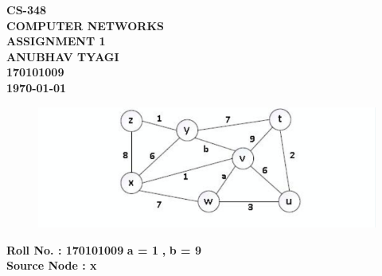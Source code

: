 \documentclass[12pt]{report}
\begin{document}
	\newlength{\strutheight}
	\settoheight{\strutheight}{\strut}
	\begin{titlepage}
		\begin{center}
			\hspace{0pt}
			\vfill
			\Huge{\textbf{CS-348\\ \vspace*{10px} COMPUTER NETWORKS}}\\
			\vspace*{30px}
			\Huge{\textbf{ASSIGNMENT 1}}\\
			\vspace*{70px}
			\Large{\textbf{ANUBHAV TYAGI}}\\
			\Large{\textbf{170101009}}\\
			\vspace*{10px}
			\Large{\textbf{\today}}
			\vfill
			\hspace{0pt}
			\vfill
		\end{center}
	\end{titlepage}
	\vspace*{10px}
	\setlength{\parindent}{0em}
	\begin{figure}[H]
		\centering
		\includegraphics[scale=0.8]{graph}
	\end{figure}
	\large{}
	\vspace*{0px}
	\hspace*{15px} \textbf{Roll No. : 170101009} \hspace*{50px} \textbf{a = 1} \textbf{,} \textbf{b = 9} \hfill\\[7pt]
	\hspace*{15px} \textbf{Source Node : x}\\
	\normalsize
\end{document}
